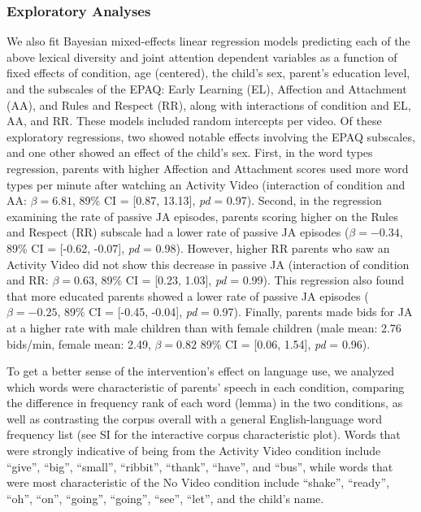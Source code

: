 \documentclass[man,floatsintext]{apa6}
\begin{document}
\hypertarget{exploratory-analyses}{%
\subsubsection{Exploratory Analyses}\label{exploratory-analyses}}

We also fit Bayesian mixed-effects linear regression models predicting each of the above lexical diversity and joint attention dependent variables as a function of fixed effects of condition, age (centered), the child's sex, parent's education level, and the subscales of the EPAQ: Early Learning (EL), Affection and Attachment (AA), and Rules and Respect (RR), along with interactions of condition and EL, AA, and RR.
These models included random intercepts per video.
Of these exploratory regressions, two showed notable effects involving the EPAQ subscales, and one other showed an effect of the child's sex.
First, in the word types regression, parents with higher Affection and Attachment scores used more word types per minute after watching an Activity Video (interaction of condition and AA: \(\beta=6.81\), 89\% CI = {[}0.87, 13.13{]}, \emph{pd} = 0.97).
Second, in the regression examining the rate of passive JA episodes, parents scoring higher on the Rules and Respect (RR) subscale had a lower rate of passive JA episodes (\(\beta=-0.34\), 89\% CI = {[}-0.62, -0.07{]}, \emph{pd} = 0.98).
However, higher RR parents who saw an Activity Video did not show this decrease in passive JA (interaction of condition and RR: \(\beta=0.63\), 89\% CI = {[}0.23, 1.03{]}, \emph{pd} = 0.99).
This regression also found that more educated parents showed a lower rate of passive JA episodes (\(\beta=-0.25\), 89\% CI = {[}-0.45, -0.04{]}, \emph{pd} = 0.97).
Finally, parents made bids for JA at a higher rate with male children than with female children (male mean: 2.76 bids/min, female mean: 2.49, \(\beta=0.82\) 89\% CI = {[}0.06, 1.54{]}, \emph{pd} = 0.96).

To get a better sense of the intervention's effect on language use, we analyzed which words were characteristic of parents' speech in each condition, comparing the difference in frequency rank of each word (lemma) in the two conditions, as well as contrasting the corpus overall with a general English-language word frequency list (see SI for the interactive corpus characteristic plot).
Words that were strongly indicative of being from the Activity Video condition include \enquote{give}, \enquote{big}, \enquote{small}, \enquote{ribbit}, \enquote{thank}, \enquote{have}, and \enquote{bus}, while words that were most characteristic of the No Video condition include \enquote{shake}, \enquote{ready}, \enquote{oh}, \enquote{on}, \enquote{going}, \enquote{going}, \enquote{see}, \enquote{let}, and the child's name.
\end{document}
